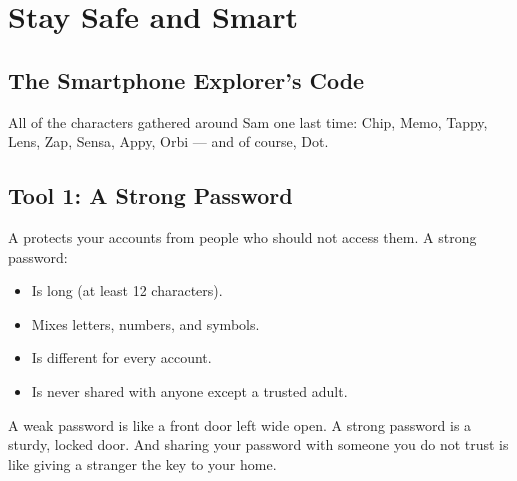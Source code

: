 
\chapter{Stay Safe and Smart}


\section*{The Smartphone Explorer's Code}

All of the characters gathered around Sam one last time:
Chip, Memo, Tappy, Lens, Zap, Sensa, Appy, Orbi — and of course, Dot.


\sectionrule

\section*{Tool 1: A Strong Password}

A  protects your accounts from people who should not access them.
A strong password:
\begin{itemize}
  \item Is long (at least 12 characters).
  \item Mixes letters, numbers, and symbols.
  \item Is different for every account.
  \item Is never shared with anyone except a trusted adult.
\end{itemize}

\begin{picturethis}
  A weak password is like a front door left wide open.
  A strong password is a sturdy, locked door.
  And sharing your password with someone you do not trust
  is like giving a stranger the key to your home.
\end{picturethis}

